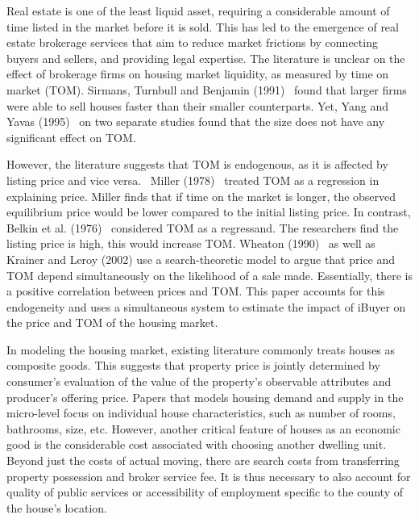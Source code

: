 Real estate is one of the least liquid asset, requiring a considerable amount of time listed in the market before it is sold. This has led to the emergence of real estate brokerage services that aim to reduce market frictions by connecting buyers and sellers, and providing legal expertise. The literature is unclear on the effect of brokerage firms on housing market liquidity, as measured by time on market (TOM). Sirmans, Turnbull and Benjamin (1991) \cite{Sirman} found that larger firms were able to sell houses faster than their smaller counterparts. Yet, Yang and Yavas (1995) \cite{Yavas} on two separate studies found that the size does not have any significant effect on TOM.  

However, the literature suggests that TOM is endogenous, as it is affected by listing price and vice versa.  Miller (1978) \cite{Miller} treated TOM as a regression in explaining price. Miller finds that if time on the market is longer, the observed equilibrium price would be lower compared to the initial listing price. In contrast, Belkin et al. (1976) \cite{Belkin} considered TOM as a regressand. The researchers find the listing price is high, this would increase TOM. Wheaton (1990) \cite{Wheaton} as well as Krainer and Leroy (2002) \cite{Krainer} use a search-theoretic model to argue that price and TOM depend simultaneously on the likelihood of a sale made. Essentially, there is a positive correlation between prices and TOM. This paper accounts for this endogeneity and uses a simultaneous system to estimate the impact of iBuyer on the price and TOM of the housing market.   

In modeling the housing market, existing literature commonly treats houses as composite goods. This suggests that property price is jointly determined by consumer’s evaluation of the value of the property's observable attributes and producer’s offering price. Papers that models housing demand and supply in the micro-level focus on individual house characteristics, such as number of rooms, bathrooms, size, etc. However, another critical feature of houses as an economic good is the considerable cost associated with choosing another dwelling unit. Beyond just the costs of actual moving, there are search costs from transferring property possession and broker service fee. It is thus necessary to also account for quality of public services or accessibility of employment specific to the county of the house’s location. 

